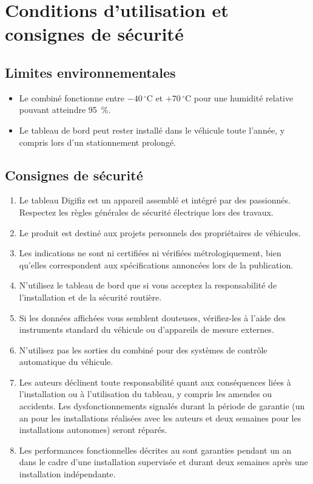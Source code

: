 \chapter{Conditions d'utilisation et consignes de sécurité}\label{ch:safety}

\section{Limites environnementales}
\begin{itemize}
    \item Le combiné fonctionne entre \(-40\,^{\circ}\mathrm{C}\) et \(+70\,^{\circ}\mathrm{C}\) pour une humidité relative pouvant atteindre 95~\%.
    \item Le tableau de bord peut rester installé dans le véhicule toute l'année, y compris lors d'un stationnement prolongé.
\end{itemize}

\section{Consignes de sécurité}
\begin{enumerate}
    \item Le tableau Digifiz est un appareil assemblé et intégré par des passionnés. Respectez les règles générales de sécurité électrique lors des travaux.
    \item Le produit est destiné aux projets personnels des propriétaires de véhicules.
    \item Les indications ne sont ni certifiées ni vérifiées métrologiquement, bien qu'elles correspondent aux spécifications annoncées lors de la publication.
    \item N'utilisez le tableau de bord que si vous acceptez la responsabilité de l'installation et de la sécurité routière.
    \item Si les données affichées vous semblent douteuses, vérifiez-les à l'aide des instruments standard du véhicule ou d'appareils de mesure externes.
    \item N'utilisez pas les sorties du combiné pour des systèmes de contrôle automatique du véhicule.
    \item Les auteurs déclinent toute responsabilité quant aux conséquences liées à l'installation ou à l'utilisation du tableau, y compris les amendes ou accidents. Les dysfonctionnements signalés durant la période de garantie (un an pour les installations réalisées avec les auteurs et deux semaines pour les installations autonomes) seront réparés.
    \item Les performances fonctionnelles décrites au  sont garanties pendant un an dans le cadre d'une installation supervisée et durant deux semaines après une installation indépendante.
\end{enumerate}
